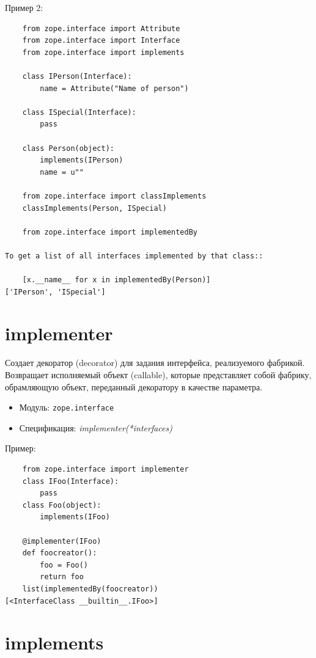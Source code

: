 \documentclass[a4paper,openany,twoside,draft]{book}
\providecommand*{\DUroletitlereference}[1]{\textsl{#1}}
\begin{document}
Пример 2:

\begin{verbatim}
    from zope.interface import Attribute
    from zope.interface import Interface
    from zope.interface import implements

    class IPerson(Interface):
        name = Attribute("Name of person")

    class ISpecial(Interface):
        pass

    class Person(object):
        implements(IPerson)
        name = u""

    from zope.interface import classImplements
    classImplements(Person, ISpecial)

    from zope.interface import implementedBy

To get a list of all interfaces implemented by that class::

    [x.__name__ for x in implementedBy(Person)]
['IPerson', 'ISpecial']
\end{verbatim}


\section*{implementer%
  \label{implementer}%
}

Создает декоратор (decorator) для задания интерфейса, реализуемого фабрикой.  Возвращает исполняемый объект (callable), которые представляет собой фабрику, обрамляющую объект, переданный декоратору в качестве параметра.

\begin{itemize}

\item Модуль: \texttt{zope.interface}

\item Спецификация: \DUroletitlereference{implementer(*interfaces)}

\end{itemize}

Пример:

\begin{verbatim}
    from zope.interface import implementer
    class IFoo(Interface):
        pass
    class Foo(object):
        implements(IFoo)

    @implementer(IFoo)
    def foocreator():
        foo = Foo()
        return foo
    list(implementedBy(foocreator))
[<InterfaceClass __builtin__.IFoo>]
\end{verbatim}


\section*{implements%
  \label{implements}%
}
\end{document}
